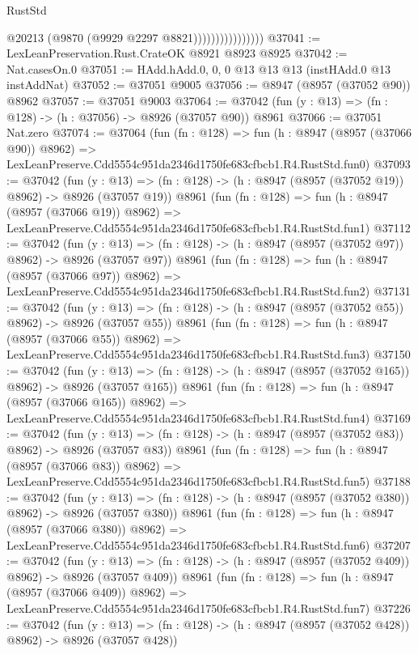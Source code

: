 \begin{lexlean}{RustStd}
\begin{coremodule}
                                @20213
                                (@9870 (@9929 @2297 @8821))))))))))))))))
@37041 := LexLeanPreservation.Rust.CrateOK @8921 @8923 @8925
@37042 := Nat.casesOn.{0}
@37051 := HAdd.hAdd.{0, 0, 0} @13 @13 @13 (instHAdd.{0} @13 instAddNat)
@37052 := @37051 @9005
@37056 := @8947 (@8957 (@37052 @90)) @8962
@37057 := @37051 @9003
@37064 := @37042 (fun (y : @13) => (fn : @128) -> (h : @37056) -> @8926 (@37057 @90)) @8961
@37066 := @37051 Nat.zero
@37074 := @37064
    (fun (fn : @128) =>
    fun (h : @8947 (@8957 (@37066 @90)) @8962) =>
    LexLeanPreserve.Cdd5554c951da2346d1750fe683cfbcb1.R4.RustStd.fun0)
@37093 := @37042
    (fun (y : @13) => (fn : @128) -> (h : @8947 (@8957 (@37052 @19)) @8962) -> @8926 (@37057 @19))
    @8961
    (fun (fn : @128) =>
    fun (h : @8947 (@8957 (@37066 @19)) @8962) =>
    LexLeanPreserve.Cdd5554c951da2346d1750fe683cfbcb1.R4.RustStd.fun1)
@37112 := @37042
    (fun (y : @13) => (fn : @128) -> (h : @8947 (@8957 (@37052 @97)) @8962) -> @8926 (@37057 @97))
    @8961
    (fun (fn : @128) =>
    fun (h : @8947 (@8957 (@37066 @97)) @8962) =>
    LexLeanPreserve.Cdd5554c951da2346d1750fe683cfbcb1.R4.RustStd.fun2)
@37131 := @37042
    (fun (y : @13) => (fn : @128) -> (h : @8947 (@8957 (@37052 @55)) @8962) -> @8926 (@37057 @55))
    @8961
    (fun (fn : @128) =>
    fun (h : @8947 (@8957 (@37066 @55)) @8962) =>
    LexLeanPreserve.Cdd5554c951da2346d1750fe683cfbcb1.R4.RustStd.fun3)
@37150 := @37042
    (fun (y : @13) => (fn : @128) -> (h : @8947 (@8957 (@37052 @165)) @8962) -> @8926 (@37057 @165))
    @8961
    (fun (fn : @128) =>
    fun (h : @8947 (@8957 (@37066 @165)) @8962) =>
    LexLeanPreserve.Cdd5554c951da2346d1750fe683cfbcb1.R4.RustStd.fun4)
@37169 := @37042
    (fun (y : @13) => (fn : @128) -> (h : @8947 (@8957 (@37052 @83)) @8962) -> @8926 (@37057 @83))
    @8961
    (fun (fn : @128) =>
    fun (h : @8947 (@8957 (@37066 @83)) @8962) =>
    LexLeanPreserve.Cdd5554c951da2346d1750fe683cfbcb1.R4.RustStd.fun5)
@37188 := @37042
    (fun (y : @13) => (fn : @128) -> (h : @8947 (@8957 (@37052 @380)) @8962) -> @8926 (@37057 @380))
    @8961
    (fun (fn : @128) =>
    fun (h : @8947 (@8957 (@37066 @380)) @8962) =>
    LexLeanPreserve.Cdd5554c951da2346d1750fe683cfbcb1.R4.RustStd.fun6)
@37207 := @37042
    (fun (y : @13) => (fn : @128) -> (h : @8947 (@8957 (@37052 @409)) @8962) -> @8926 (@37057 @409))
    @8961
    (fun (fn : @128) =>
    fun (h : @8947 (@8957 (@37066 @409)) @8962) =>
    LexLeanPreserve.Cdd5554c951da2346d1750fe683cfbcb1.R4.RustStd.fun7)
@37226 := @37042
    (fun (y : @13) => (fn : @128) -> (h : @8947 (@8957 (@37052 @428)) @8962) -> @8926 (@37057 @428))

\end{coremodule}
\end{lexlean}
